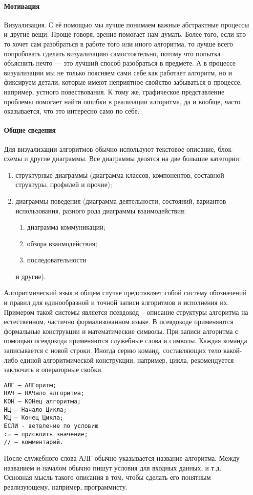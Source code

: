\documentclass[fontsize=14bp]{report}
\begin{document}
\paragraph{Мотивация}
Визуализация. С её помощью мы лучше понимаем важные абстрактные процессы и другие вещи. Проще говоря, зрение помогает нам думать. Более того, если кто-то хочет сам разобраться в работе того или иного алгоритма, то лучше всего попробовать сделать визуализацию самостоятельно, потому что попытка объяснить нечто — это лучший способ разобраться в предмете. А в процессе визуализации мы не только поясняем сами себе как работает алгоритм, но и фиксируем детали, которые имеют неприятное свойство забываться в процессе, например, устного повествования. К тому же, графическое представление проблемы помогает найти ошибки в реализации алгоритма, да и вообще, часто оказывается, что это интересно само по себе. 
\paragraph{Общие сведения}
Для визуализации алгоритмов обычно используют текстовое описание, блок-схемы и другие диаграммы. Все диаграммы делятся на две большие категории:
\begin{enumerate}
    \item структурные диаграммы (диаграмма классов, компонентов, составной структуры, профилей и прочие);
    \item диаграммы поведения (диаграмма деятельности, состояний, вариантов использования, разного рода диаграммы взаимодействия: 
    \begin{enumerate}
        \item диаграмма коммуникации;
        \item обзора взаимодействия; 
        \item последовательности 
    \end{enumerate}
    и другие).
\end{enumerate}

Алгоритмический язык в общем случае представляет собой систему обозначений и правил для единообразной и точной записи алгоритмов и исполнения их. Примером такой системы является псевдокод – описание структуры алгоритма на естественном, частично формализованном языке. В псевдокоде применяются формальные конструкции и математические символы. При записи алгоритма с помощью псевдокода применяются служебные слова и символы. Каждая команда записывается с новой строки. Иногда серию команд, составляющих тело какой-либо единой алгоритмической конструкции, например, цикла, рекомендуется заключать в операторные скобки.
\begin{multicols}{2}
\begin{verbatim}
АЛГ – АЛГоритм;
НАЧ – НАЧало алгоритма;
КОН – КОНец алгоритма;
НЦ – Начало Цикла;
КЦ – Конец Цикла;
ЕСЛИ - ветвление по условию
:= – присвоить значение;
// – комментарий.
\end{verbatim}
\columnbreak
После служебного слова АЛГ обычно указывается название алгоритма. Между названием и началом обычно пишут условия для входных данных, и т.д. Основная мысль такого описания в том, чтобы сделать его понятным реализующему, например, программисту.
\end{multicols}
\end{document}
